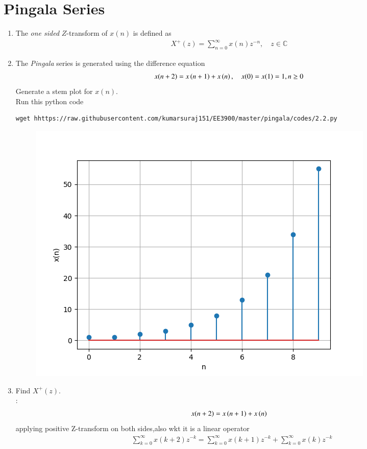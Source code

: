 \documentclass[journal,12pt,twocolumn]{IEEEtran}
\renewcommand\thesection{\arabic{section}}
\begin{document}
\section{Pingala Series}
\begin{enumerate}[label=\thesection.\arabic*,ref=\thesection.\theenumi]
\item The {\em one sided} $Z$-transform of $x(n)$ is defined as 
\begin{align}
	X^{+}(z) = \sum_{n = 0}^{\infty}x(n)z^{-n}, \quad z \in \mathbb{C}
\label{eq:one-Z}
\end{align}

	\item The {\em Pingala} series is generated using the difference equation 
\begin{align}
	x(n+2) = x\left(n+1\right) + x\left(n\right),  \quad x(0) = x(1) = 1, n \ge 0
	\label{eq:10-pingala}
\end{align}
Generate a stem plot for $x(n)$.\\
\solution  Run this python code 
\begin{lstlisting}
wget hhttps://raw.githubusercontent.com/kumarsuraj151/EE3900/master/pingala/codes/2.2.py
\end{lstlisting}
\begin{figure}[h]
	\centering
	\includegraphics[width=0.7\columnwidth]{./figs/Fig 2.5.png}
	\caption{}
\end{figure}
\item 		Find $X^{+}(z)$.\\
\solution: 
\begin{align}
	x(n+2) = x\left(n+1\right) + x\left(n\right)
\end{align}
applying positive Z-transform on both sides,also wkt it is a linear operator
\begin{align}
	&\sum_{k=0}^{\infty}x(k+2)z^{-k}=\sum_{k=0}^{\infty}x(k+1)z^{-k}+\sum_{k=0}^{\infty}x(k)z^{-k}\\

\end{align}
\end{enumerate}
\end{document}

